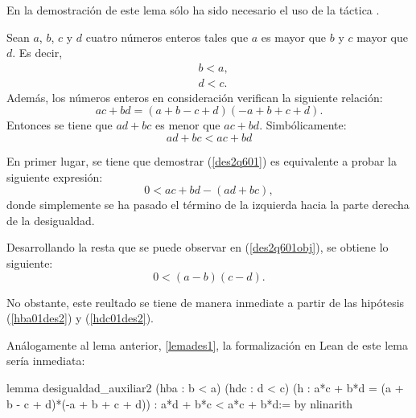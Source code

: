 En la demostración de este lema sólo ha sido necesario el uso de la táctica
.

\begin{lema}\label{lemades2}
  Sean \(a\), \(b\), \(c\) y \(d\) cuatro números enteros tales que \(a\) es
  mayor que \(b\) y \(c\) mayor que \(d\). Es decir, 
  \begin{align}
    &b<a,\tag{hba}\label{hba01des2}\\
    &d<c.\tag{hdc}\label{hdc01des2}
  \end{align}
  Además, los números enteros en consideración verifican la siguiente relación:
    \begin{equation}\tag{h}
      ac+bd = (a+b-c+d)(-a+b+c+d).
    \end{equation}
    Entonces se tiene que \(ad+bc\) es menor que \(ac+bd\). Simbólicamente:
    \begin{equation}\label{des2q601}
      ad+bc<ac+bd
    \end{equation}
\end{lema}

\begin{demostracion}
  En primer lugar, se tiene que demostrar (\ref{des2q601}) es equivalente a
  probar la siguiente expresión:
  \begin{equation}\label{des2q601obj}
      0<ac+bd-(ad+bc),
  \end{equation}
  donde simplemente se ha pasado el término de la izquierda hacia la parte
  derecha de la desigualdad.

  Desarrollando la resta que se puede observar en (\ref{des2q601obj}), se
  obtiene lo siguiente:
  \begin{equation}
    0<(a-b)(c-d).
  \end{equation}

  No obstante, este reultado se tiene de manera inmediate a partir de las
  hipótesis (\ref{hba01des2}) y (\ref{hdc01des2}).
\end{demostracion}

Análogamente al lema anterior, \ref{lemades1}, la formalización en Lean de
este lema sería inmediata:
\begin{leancode}
lemma desigualdad_auxiliar2
  (hba : b < a)
  (hdc : d < c)
  (h : a*c + b*d = (a + b - c + d)*(-a + b + c + d))
  : a*d + b*c < a*c + b*d:=
by nlinarith
\end{leancode}


